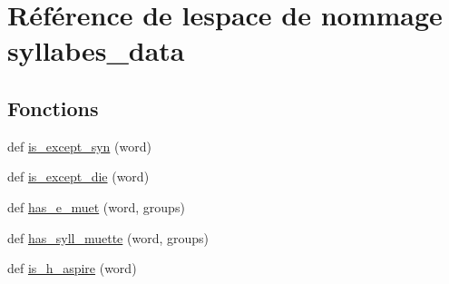 \hypertarget{namespacesyllabes__data}{}\section{Référence de l\textquotesingle{}espace de nommage syllabes\+\_\+data}
\label{namespacesyllabes__data}
\subsection*{Fonctions}
\begin{DoxyCompactItemize}
\item 
def \hyperlink{namespacesyllabes__data_a8d47f8bfaff3d43a57c6cc05c8d69175}{is\+\_\+except\+\_\+syn} (word)
\item 
def \hyperlink{namespacesyllabes__data_a5cba002e6c174b704f75f6f75e7af374}{is\+\_\+except\+\_\+die} (word)
\item 
def \hyperlink{namespacesyllabes__data_a3b2c7e2a5fad36cb70b9826841f35167}{has\+\_\+e\+\_\+muet} (word, groups)
\item 
def \hyperlink{namespacesyllabes__data_a5780174cb8319a3f78159f7fc23ea744}{has\+\_\+syll\+\_\+muette} (word, groups)
\item 
def \hyperlink{namespacesyllabes__data_a311cf0af85bb4aa21de9fcc81aa0bc52}{is\+\_\+h\+\_\+aspire} (word)
\end{DoxyCompactItemize}
